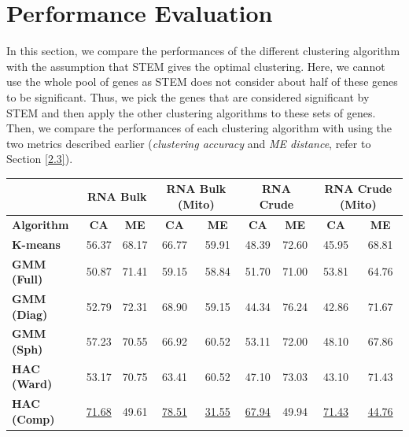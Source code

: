 \section{Performance Evaluation}
In this section, we compare the performances of the different clustering algorithm with the assumption that STEM gives the optimal clustering. Here, we cannot use the whole pool of genes as STEM does not consider about half of these genes to be significant. Thus, we pick the genes that are considered significant by STEM and then apply the other clustering algorithms to these sets of genes. Then, we compare the performances of each clustering algorithm with using the two metrics described earlier (\textit{clustering accuracy} and \textit{ME distance}, refer to Section \ref{2.3}).  
\begin{table}[H]
	\centering
		\begin{tabular}{lcccccccc}
			\hline
			& \multicolumn{2}{c}{\textbf{RNA Bulk}} & \multicolumn{2}{c}{\textbf{RNA Bulk (Mito)}} & \multicolumn{2}{c}{\textbf{RNA Crude}} & \multicolumn{2}{c}{\textbf{RNA Crude (Mito)}} \\ \hline
			\textbf{Algorithm}  & \textbf{CA}       & \textbf{ME}       & \textbf{CA}           & \textbf{ME}          & \textbf{CA}        & \textbf{ME}       & \textbf{CA}           & \textbf{ME}           \\ \hline
			\textbf{K-means}    & 56.37             & 68.17             & 66.77                 & 59.91                & 48.39    & 72.60             & 45.95                 & 68.81                 \\  \hline
			\textbf{GMM (Full)} & 50.87             & 71.41             & 59.15                 & 58.84       & 51.70              & 71.00             & 53.81                 & 64.76        \\
			\textbf{GMM (Diag)} & 52.79             & 72.31             & 68.90                 & 59.15                & 44.34              & 76.24    & 42.86                 & 71.67               \\
			\textbf{GMM (Sph)}  & 57.23            & 70.55             & 66.92                 & 60.52                & 53.11              & 72.00             & 48.10                 & 67.86                 \\ \hline
			\textbf{HAC (Ward)} & 53.17             & 70.75    & 63.41                 &60.52               & 47.10              & 73.03             & 43.10                 & 71.43                 \\
			\textbf{HAC (Comp)} & \underline{71.68}    & 49.61             & \underline{78.51}        & \underline{31.55}               & \underline{67.94}              & 49.94             & \underline{71.43}       & \underline{44.76}                 \\

\end{tabular}
\end{table}
